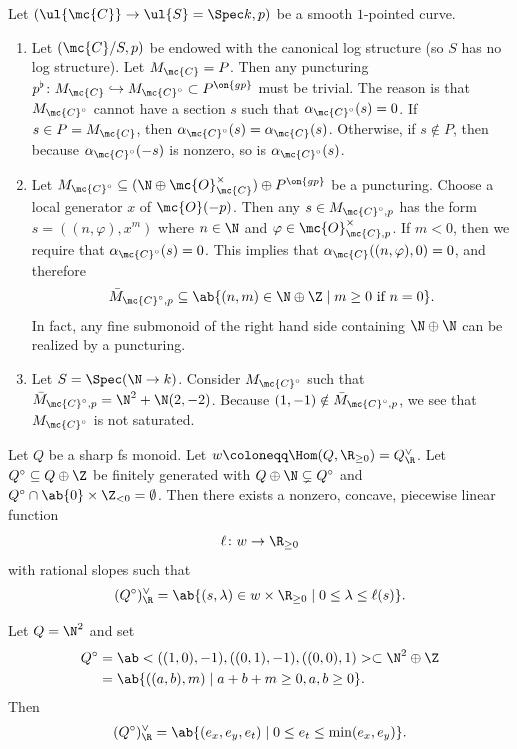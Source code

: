 \begin{exm}
    Let \((\ul{\mc{C}} \to \ul{S} = \Spec k, p)\) be a smooth \(1\)-pointed curve.
    \begin{enumerate}
        \item Let \((\mc{C}/S, p)\) be endowed with the canonical log structure (so \(S\) has no log structure). Let \(M_{\mc{C}} = P\). Then any puncturing \(p^{\flat} \colon M_{\mc{C}} \hookrightarrow M_{\mc{C}^{\circ}} \subset P^{\on{gp}}\) must be trivial. The reason is that \(M_{\mc{C}^{\circ}}\) cannot have a section \(s\) such that \(\alpha_{\mc{C}^{\circ}}(s) = 0\). If \(s \in P = M_{\mc{C}}\), then \(\alpha_{\mc{C}^{\circ}}(s) = \alpha_{\mc{C}}(s)\). Otherwise, if \(s \notin P\), then because \(\alpha_{\mc{C}^{\circ}}(-s)\) is nonzero, so is \(\alpha_{\mc{C}^{\circ}}(s)\).
        \item Let \(M_{\mc{C}^{\circ}} \subseteq (\N \oplus \mc{O}_{\mc{C}}^{\times}) \oplus P^{\on{gp}}\) be a puncturing. Choose a local generator \(x\)  of \(\mc{O}(-p)\). Then any \(s \in M_{\mc{C}^{\circ}, p}\) has the form \(s = ((n, \varphi), x^m)\) where \(n \in \N\) and \(\varphi \in \mc{O}_{\mc{C}, p}^{\times}\). If \(m < 0\), then we require that \(\alpha_{\mc{C}^{\circ}}(s) = 0\). This implies that \(\alpha_{\mc{C}}((n, \varphi), 0) = 0\), and therefore
            \[ \bar{M}_{\mc{C}^{\circ}, p} \subseteq \ab\{(n, m) \in \N \oplus \Z \mid m \geq 0 \text{ if } n = 0 \}. \]
            In fact, any fine submonoid of the right hand side containing \(\N \oplus \N\) can be realized by a puncturing.
        \item Let \(S = \Spec(\N \to k)\). Consider \(M_{\mc{C}^{\circ}}\) such that \(\bar{M}_{\mc{C}^{\circ}, p} = \N^2 + \N (2,-2)\). Because \((1,-1) \notin \bar{M}_{\mc{C}^{\circ}, p}\), we see that \(M_{\mc{C}^{\circ}}\) is not saturated.
    \end{enumerate}
\end{exm}

\begin{lem}
    Let \(Q\) be a sharp fs monoid. Let \(w \coloneqq \Hom(Q, \R_{\geq 0}) = Q_{\R}^{\vee}\). Let \(Q^{\circ} \subseteq Q \oplus \Z\) be finitely generated with \(Q \oplus \N \subsetneq Q^{\circ}\) and \(Q^{\circ} \cap \ab\{0\} \times \Z_{<0} = \emptyset\). Then there exists a nonzero, concave, piecewise linear function
    \[ \ell \colon w \to \R_{\geq 0} \]
    with rational slopes such that
    \[ (Q^{\circ})_{\R}^{\vee} = \ab\{ (s, \lambda) \in w \times \R_{\geq 0} \mid 0 \leq \lambda \leq \ell(s) \}. \]
\end{lem}

\begin{exm}
    Let \(Q = \N^2\) and set 
    \begin{align*}
        Q^{\circ} &= \ab<((1,0), -1), ((0,1), -1), ((0,0),1)> \subset \N^2 \oplus \Z \\
        &= \ab\{((a,b), m) \mid a+b+m \geq 0, a,b \geq 0 \}.
    \end{align*}
    Then
    \[ (Q^{\circ})_{\R}^{\vee} = \ab\{ (e_x, e_y, e_t) \mid 0 \leq e_t \leq \min(e_x, e_y) \}. \]
\end{exm}






